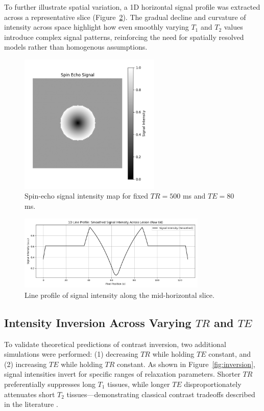 \documentclass[10pt,a4paper,twoside]{article}
\begin{document}
\begin{enumerate}
To further illustrate spatial variation, a 1D horizontal signal profile was extracted across a representative slice (Figure~\ref{fig:lineprofile}). The gradual decline and curvature of intensity across space highlight how even smoothly varying \( T_1 \) and \( T_2 \) values introduce complex signal patterns, reinforcing the need for spatially resolved models rather than homogenous assumptions.

\begin{figure}[htbp!]
\centering
\includegraphics[width=0.6\textwidth]{signalintensitymap.png}
\caption{Spin-echo signal intensity map for fixed \( TR = 500 \) ms and \( TE = 80 \) ms.}
\label{fig:signalmap}
\end{figure}

\begin{figure}[htbp!]
\centering
\includegraphics[width=0.8\textwidth]{1Dlineprofilesignal.png}
\caption{Line profile of signal intensity along the mid-horizontal slice.}
\label{fig:lineprofile}
\end{figure}

\subsection{Intensity Inversion Across Varying \( TR \) and \( TE \)}

To validate theoretical predictions of contrast inversion, two additional simulations were performed: (1) decreasing \( TR \) while holding \( TE \) constant, and (2) increasing \( TE \) while holding \( TR \) constant. As shown in Figure~\ref{fig:inversion}, signal intensities invert for specific ranges of relaxation parameters. Shorter \( TR \) preferentially suppresses long \( T_1 \) tissues, while longer \( TE \) disproportionately attenuates short \( T_2 \) tissues—demonstrating classical contrast tradeoffs described in the literature \cite{brown2014}.


\end{enumerate}
\end{document}

